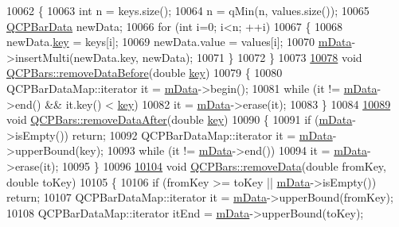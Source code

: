 \begin{DoxyCode}
10062 \{
10063   \textcolor{keywordtype}{int} n = keys.size();
10064   n = qMin(n, values.size());
10065   \hyperlink{a00026}{QCPBarData} newData;
10066   \textcolor{keywordflow}{for} (\textcolor{keywordtype}{int} i=0; i<n; ++i)
10067   \{
10068     newData.\hyperlink{a00026_afe544b035ef19027ea3d65adeaf81b42}{key} = keys[i];
10069     newData.value = values[i];
10070     \hyperlink{a00027_aef28d29d51ef84b608ecd22c55d531ff}{mData}->insertMulti(newData.key, newData);
10071   \}
10072 \}
10073 
\hypertarget{a00115_source_l10078}{}\hyperlink{a00027_a9d12779a3fad4820aad2c428f368298d}{10078} \textcolor{keywordtype}{void} \hyperlink{a00027_a9d12779a3fad4820aad2c428f368298d}{QCPBars::removeDataBefore}(\textcolor{keywordtype}{double} \hyperlink{a00116_a94bb892c30911cd62cba0707a5395be4}{key})
10079 \{
10080   QCPBarDataMap::iterator it = \hyperlink{a00027_aef28d29d51ef84b608ecd22c55d531ff}{mData}->begin();
10081   \textcolor{keywordflow}{while} (it != \hyperlink{a00027_aef28d29d51ef84b608ecd22c55d531ff}{mData}->end() && it.key() < \hyperlink{a00116_a94bb892c30911cd62cba0707a5395be4}{key})
10082     it = \hyperlink{a00027_aef28d29d51ef84b608ecd22c55d531ff}{mData}->erase(it);
10083 \}
10084 
\hypertarget{a00115_source_l10089}{}\hyperlink{a00027_a99de6e7abbbf03fb41fa604c7f08aa8b}{10089} \textcolor{keywordtype}{void} \hyperlink{a00027_a99de6e7abbbf03fb41fa604c7f08aa8b}{QCPBars::removeDataAfter}(\textcolor{keywordtype}{double} \hyperlink{a00116_a94bb892c30911cd62cba0707a5395be4}{key})
10090 \{
10091   \textcolor{keywordflow}{if} (\hyperlink{a00027_aef28d29d51ef84b608ecd22c55d531ff}{mData}->isEmpty()) \textcolor{keywordflow}{return};
10092   QCPBarDataMap::iterator it = \hyperlink{a00027_aef28d29d51ef84b608ecd22c55d531ff}{mData}->upperBound(key);
10093   \textcolor{keywordflow}{while} (it != \hyperlink{a00027_aef28d29d51ef84b608ecd22c55d531ff}{mData}->end())
10094     it = \hyperlink{a00027_aef28d29d51ef84b608ecd22c55d531ff}{mData}->erase(it);
10095 \}
10096 
\hypertarget{a00115_source_l10104}{}\hyperlink{a00027_a1fe9bcb57d670defea1bb65cadf43765}{10104} \textcolor{keywordtype}{void} \hyperlink{a00027_a1fe9bcb57d670defea1bb65cadf43765}{QCPBars::removeData}(\textcolor{keywordtype}{double} fromKey, \textcolor{keywordtype}{double} toKey)
10105 \{
10106   \textcolor{keywordflow}{if} (fromKey >= toKey || \hyperlink{a00027_aef28d29d51ef84b608ecd22c55d531ff}{mData}->isEmpty()) \textcolor{keywordflow}{return};
10107   QCPBarDataMap::iterator it = \hyperlink{a00027_aef28d29d51ef84b608ecd22c55d531ff}{mData}->upperBound(fromKey);
10108   QCPBarDataMap::iterator itEnd = \hyperlink{a00027_aef28d29d51ef84b608ecd22c55d531ff}{mData}->upperBound(toKey);

\end{DoxyCode}

